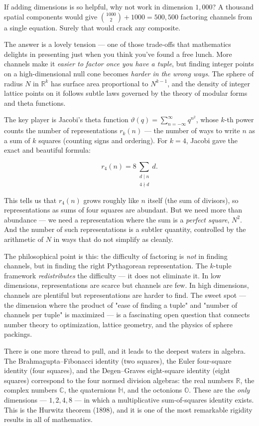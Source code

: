 \documentclass[12pt, letterpaper, openany]{book}
\theoremstyle{definition}
\theoremstyle{remark}
\begin{document}
If adding dimensions is so helpful, why not work in dimension $1{,}000$? A thousand spatial components would give $\binom{1000}{2} + 1000 = 500{,}500$ factoring channels from a single equation. Surely that would crack any composite.

The answer is a lovely tension --- one of those trade-offs that mathematics delights in presenting just when you think you've found a free lunch. More channels make it \textit{easier to factor once you have a tuple}, but finding integer points on a high-dimensional null cone becomes \textit{harder in the wrong ways}. The sphere of radius $N$ in $\mathbb{R}^k$ has surface area proportional to $N^{k-1}$, and the density of integer lattice points on it follows subtle laws governed by the theory of modular forms and theta functions.

The key player is Jacobi's theta function $\vartheta(q) = \sum_{n=-\infty}^{\infty} q^{n^2}$, whose $k$-th power counts the number of representations $r_k(n)$ --- the number of ways to write $n$ as a sum of $k$ squares (counting signs and ordering). For $k = 4$, Jacobi gave the exact and beautiful formula:

\[
r_4(n) = 8 \sum_{\substack{d \mid n \\ 4 \nmid d}} d.
\]

This tells us that $r_4(n)$ grows roughly like $n$ itself (the sum of divisors), so representations as sums of four squares are abundant. But we need more than abundance --- we need a representation where the sum is a \textit{perfect square}, $N^2$. And the number of such representations is a subtler quantity, controlled by the arithmetic of $N$ in ways that do not simplify as cleanly.

The philosophical point is this: the difficulty of factoring is \textit{not} in finding channels, but in finding the right Pythagorean representation. The $k$-tuple framework \textit{redistributes} the difficulty --- it does not eliminate it. In low dimensions, representations are scarce but channels are few. In high dimensions, channels are plentiful but representations are harder to find. The sweet spot --- the dimension where the product of "ease of finding a tuple" and "number of channels per tuple" is maximized --- is a fascinating open question that connects number theory to optimization, lattice geometry, and the physics of sphere packings.

There is one more thread to pull, and it leads to the deepest waters in algebra. The Brahmagupta--Fibonacci identity (two squares), the Euler four-square identity (four squares), and the Degen--Graves eight-square identity (eight squares) correspond to the four normed division algebras: the real numbers $\mathbb{R}$, the complex numbers $\mathbb{C}$, the quaternions $\mathbb{H}$, and the octonions $\mathbb{O}$. These are the \textit{only} dimensions --- $1, 2, 4, 8$ --- in which a multiplicative sum-of-squares identity exists. This is the Hurwitz theorem (1898), and it is one of the most remarkable rigidity results in all of mathematics.
\end{document}
